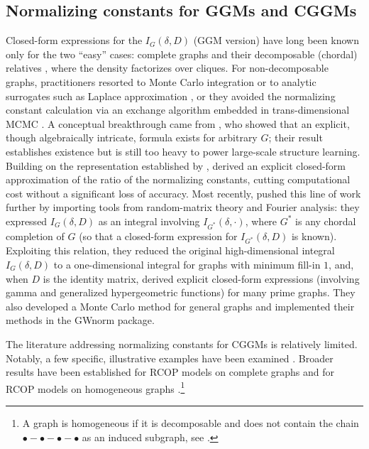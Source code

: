 \documentclass[12pt]{amsart}
\theoremstyle{plain}
\theoremstyle{definition}
\theoremstyle{remark}
\newcommand{\1}{\mathbf{1}}
\begin{document}
\subsection{Normalizing constants for GGMs and CGGMs}
Closed-form expressions for the $I_G(\delta,D)$ (GGM version) have long been known only for the two ``easy'' cases: complete graphs \citep{Muir} and their decomposable (chordal) relatives \citep{Ro02}, where the density factorizes over cliques. For non-decomposable graphs, practitioners resorted to Monte Carlo integration \citep{A-KM05} or to analytic surrogates such as Laplace approximation \citep{LD11}, or they avoided the normalizing constant calculation via an exchange algorithm embedded in trans-dimensional MCMC \citep{Len13,MohWit15}. A conceptual breakthrough came from \citet{ULR18}, who showed that an explicit, though algebraically intricate, formula exists for arbitrary $G$; their result establishes existence but is still too heavy to power large-scale structure learning. Building on the representation established by \citet{A-KM05}, \citet{MML23} derived an explicit closed-form approximation of the ratio of the normalizing constants, cutting computational cost without a significant loss of accuracy. Most recently, \citet{WMK25} pushed this line of work further by importing tools from random-matrix theory and Fourier analysis: they expressed $I_G(\delta,D)$ as an integral involving $I_{G^\ast}(\delta,\cdot)$, where $G^\ast$ is any chordal completion of $G$ (so that a closed-form expression for $I_{G^\ast}(\delta,D)$ is known). Exploiting this relation, they reduced the original high-dimensional integral $I_G(\delta,D)$ to a one-dimensional integral for graphs with minimum fill-in $1$, and, when $D$ is the identity matrix, derived explicit closed-form expressions (involving gamma and generalized hypergeometric functions) for many prime graphs.
They also developed a Monte Carlo method for general graphs
and implemented their methods in the \textsf{GWnorm} package.

The literature addressing normalizing constants for CGGMs is relatively limited. Notably, a few specific, illustrative examples have been examined \citep{MLG15,LiGM20}. Broader results have been established for RCOP models on complete graphs \citep{GIKM22} and for RCOP models on homogeneous graphs \citep{GIK22}.\footnote{A graph is homogeneous if it is decomposable and does not contain the chain $\bullet-\bullet-\bullet-\bullet$ as an induced subgraph, see \citep{LM07}.}
\end{document}
